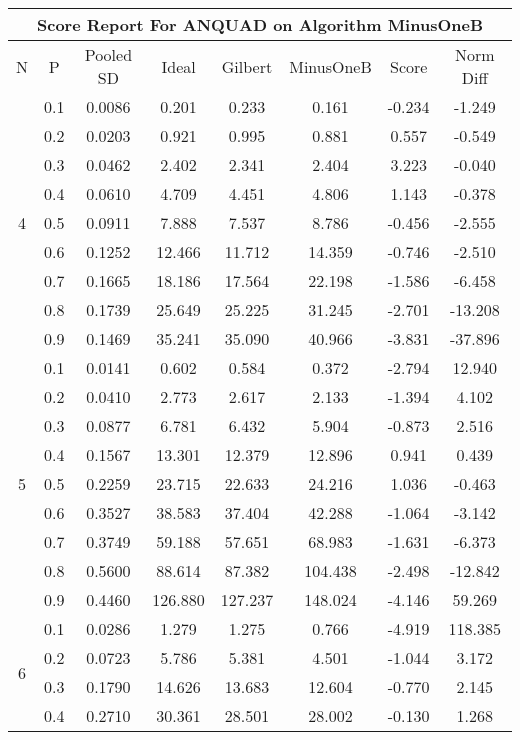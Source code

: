 \documentclass[11pt,a4paper]{report}
\begin{document}
\begin{longtable}{ | c | c || c | c | c | c | c | c | }
\hline
\multicolumn{8}{|c|}{ Score Report For ANQUAD on Algorithm MinusOneB} \\
\hline
N & P & Pooled SD &  Ideal &  Gilbert & MinusOneB  & Score & Norm Diff \\
 \hline
 \hline
 \endhead
\multirow{9}{*}{4} & 0.1 & 0.0086 & 0.201 & 0.233 & 0.161 & -0.234 & -1.249 \\
 & 0.2 & 0.0203 & 0.921 & 0.995 & 0.881 & 0.557 & -0.549 \\
 & 0.3 & 0.0462 & 2.402 & 2.341 & 2.404 & 3.223 & -0.040 \\
 & 0.4 & 0.0610 & 4.709 & 4.451 & 4.806 & 1.143 & -0.378 \\
 & 0.5 & 0.0911 & 7.888 & 7.537 & 8.786 & -0.456 & -2.555 \\
 & 0.6 & 0.1252 & 12.466 & 11.712 & 14.359 & -0.746 & -2.510 \\
 & 0.7 & 0.1665 & 18.186 & 17.564 & 22.198 & -1.586 & -6.458 \\
 & 0.8 & 0.1739 & 25.649 & 25.225 & 31.245 & -2.701 & -13.208 \\
 & 0.9 & 0.1469 & 35.241 & 35.090 & 40.966 & -3.831 & -37.896 \\
 \hline
\multirow{9}{*}{5} & 0.1 & 0.0141 & 0.602 & 0.584 & 0.372 & -2.794 & 12.940 \\
 & 0.2 & 0.0410 & 2.773 & 2.617 & 2.133 & -1.394 & 4.102 \\
 & 0.3 & 0.0877 & 6.781 & 6.432 & 5.904 & -0.873 & 2.516 \\
 & 0.4 & 0.1567 & 13.301 & 12.379 & 12.896 & 0.941 & 0.439 \\
 & 0.5 & 0.2259 & 23.715 & 22.633 & 24.216 & 1.036 & -0.463 \\
 & 0.6 & 0.3527 & 38.583 & 37.404 & 42.288 & -1.064 & -3.142 \\
 & 0.7 & 0.3749 & 59.188 & 57.651 & 68.983 & -1.631 & -6.373 \\
 & 0.8 & 0.5600 & 88.614 & 87.382 & 104.438 & -2.498 & -12.842 \\
 & 0.9 & 0.4460 & 126.880 & 127.237 & 148.024 & -4.146 & 59.269 \\
 \hline
\multirow{9}{*}{6} & 0.1 & 0.0286 & 1.279 & 1.275 & 0.766 & -4.919 & 118.385 \\
 & 0.2 & 0.0723 & 5.786 & 5.381 & 4.501 & -1.044 & 3.172 \\
 & 0.3 & 0.1790 & 14.626 & 13.683 & 12.604 & -0.770 & 2.145 \\
 & 0.4 & 0.2710 & 30.361 & 28.501 & 28.002 & -0.130 & 1.268 \\

\end{longtable}
\end{document}
